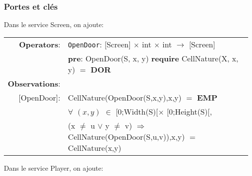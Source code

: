 \documentclass[8pt]{article}
\begin{document}
\subsubsection{Portes et clés}

Dans le service \textrm{Screen}, on ajoute:
{\small
  \begin{longtable}{rl}
    \textbf{Operators}: & \texttt{OpenDoor}: \textrm{[Screen]} $\times$ \textrm{int} $\times$ \textrm{int}  $\rightarrow$ \textrm{[Screen]} \\
    & \quad\quad \textbf{pre}: \textrm{OpenDoor(S, x, y)} \textbf{require} \textrm{CellNature(X, x, y)} $=$ \textbf{DOR}\\
    \textbf{Observations}:&\\
    \textrm{[OpenDoor]}: & \textrm{CellNature(OpenDoor(S,x,y),x,y)} $=$ \textbf{EMP} \\
    & $\forall$ $(x,y)$ $\in$ \textrm{[0;Width(S)[}$\times$ \textrm{[0;Height(S)[}, \\
    & \quad\quad (\textrm{x} $\neq$ \textrm{u} $\lor$ \textrm{y} $\neq$ \textrm{v}) $\Rightarrow$ \textrm{CellNature(OpenDoor(S,u,v)),x,y)} $=$ \textrm{CellNature(x,y)} \\
  \end{longtable}}

Dans le service \textrm{Player}, on ajoute:
\end{document}

